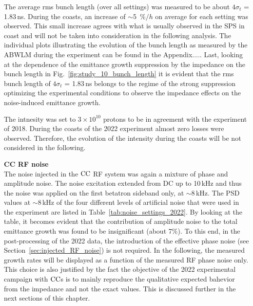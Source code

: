 
The average rms bunch length (over all settings) was measured to be about $4\sigma_t$ = 1.83\,ns. During the coasts, an increase of $\sim$5~$\%/h$ on average for each setting was observed. This small increase agrees with what is usually observed in the SPS in coast and will not be taken into consideration in the following analysis. The individual plots illustrating the evolution of the bunch length as measured by the ABWLM during the experiment can be found in the Appendix..... Last, looking at the dependence of the emittance growth suppression by the impedance on the bunch length in Fig.~\ref{fig:study_10_bunch_length} it is evident that the rms bunch length of $4\sigma_t$ = 1.83\,ns belongs to the regime of the strong suppression optimizing the experimental conditions to observe the impedance effects on the noise-induced emittance growth.

The intnesity was set to $3 \times 10^{10}$ protons to be in agreement with the experiment of 2018. During the coasts of the 2022 experiment almost zero losses were observed. Therefore, the evolution of the intensity during the coasts will be not considered in the following.


\textbf{CC RF noise}\\
The noise injected in the ${\mathrm{CC}}$ RF system was again a mixture of phase and amplitude noise. The noise excitation extended from DC up to 10\,kHz and thus the noise was applied on the first betatron sideband only, at $\sim$8\,kHz. The PSD values at $\sim$8\,kHz of the four different levels of artificial noise that were used in the experiment are listed in Table~\ref{tab:noise_settings_2022}. By looking at the table, it becomes evident that the contribution of amplitude noise to the total emittance growth was found to be insignificant (about 7$\%$). To this end, in the post-processing of the 2022 data, the introduction of the effective phase noise (see Section~\ref{sec:injected_RF_noise}) is not required. In the following, the measured growth rates will be displayed as a function of the measured RF phase noise only. This choice is also justified by the fact the objective of the 2022 experimental campaign with ${\mathrm{CC}}$s is to mainly reproduce the qualitative expected bahevior from the impedance and not the exact values. This is discussed further in the next sections of this chapter.



